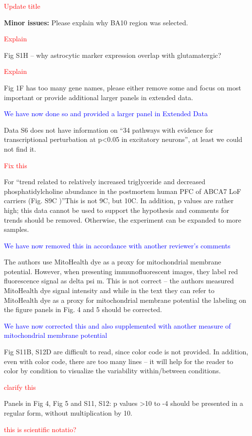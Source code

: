 \textcolor{red}{Update title}

\textbf{Minor issues:}
Please explain why BA10 region was selected.

\textcolor{red}{Explain}

Fig S1H – why astrocytic marker expression overlap with glutamatergic?
	
\textcolor{red}{Explain}

Fig 1F has too many gene names, please either remove some and focus on most important or provide additional larger panels in extended data.
	
\textcolor{blue}{We have now done so and provided a larger panel in Extended Data}

Data S6 does not have information on “34 pathways with evidence for transcriptional perturbation at p<0.05 in excitatory neurons”, at least we could not find it.

\textcolor{red}{Fix this}

For “trend related to relatively increased triglyceride and decreased phosphatidylcholine abundance in the postmortem human PFC of ABCA7 LoF carriers (Fig. S9C )”This is not 9C, but 10C. In addition, p values are rather high; this data cannot be used to support the hypothesis and comments for trends should be removed. Otherwise, the experiment can be expanded to more samples.

\textcolor{blue}{We have now removed this in accordance with another reviewer's comments}

The authors use MitoHealth dye as a proxy for mitochondrial membrane potential. However, when presenting immunofluorescent images, they label red fluorescence signal as delta psi m. This is not correct – the authors measured MitoHealth dye signal intensity and while in the text they can refer to MitoHealth dye as a proxy for mitochondrial membrane potential the labeling on the figure panels in Fig. 4 and 5 should be corrected.

\textcolor{blue}{We have now corrected this and also supplemented with another measure of mitochondrial membrane potential}

Fig S11B, S12D are difficult to read, since color code is not provided. In addition, even with color code, there are too many lines – it will help for the reader to color by condition to visualize the variability within/between conditions.

\textcolor{red}{clarify this}

Panels in Fig 4, Fig 5 and S11, S12: p values >10 to -4 should be presented in a regular form, without multiplication by 10.

\textcolor{red}{this is scientific notatio?}
